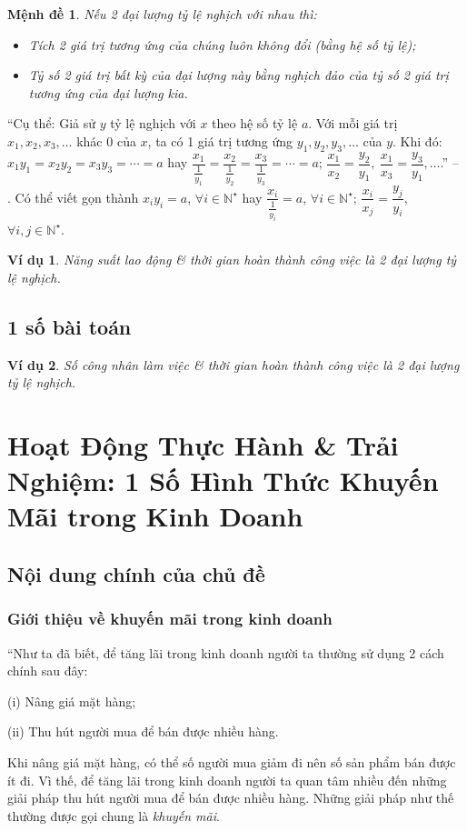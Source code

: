 \documentclass[oneside]{book}
\numberwithin{equation}{section}
\newtheorem{vidu}{Ví dụ}[section]
\newtheorem{menhde}{Mệnh đề}[section]
\begin{document}
\begin{menhde}
	Nếu 2 đại lượng tỷ lệ nghịch với nhau thì:
	\begin{itemize}
		\item Tích 2 giá trị tương ứng của chúng luôn không đổi (bằng hệ số tỷ lệ);
		\item Tỷ số 2 giá trị bất kỳ của đại lượng này bằng nghịch đảo của tỷ số 2 giá trị tương ứng của đại lượng kia.
	\end{itemize}
\end{menhde}
``Cụ thể: Giả sử $y$ tỷ lệ nghịch với $x$ theo hệ số tỷ lệ $a$. Với mỗi giá trị $x_1,x_2,x_3,\ldots$ khác $0$ của $x$, ta có 1 giá trị tương ứng $y_1,y_2,y_3,\ldots$ của $y$. Khi đó: $x_1y_1 = x_2y_2 = x_3y_3 = \cdots = a$ hay $\dfrac{x_1}{\frac{1}{y_1}} = \dfrac{x_2}{\frac{1}{y_2}} = \dfrac{x_3}{\frac{1}{y_3}} = \cdots = a$; $\dfrac{x_1}{x_2} = \dfrac{y_2}{y_1},\ \dfrac{x_1}{x_3} = \dfrac{y_3}{y_1},\ldots$.'' -- \cite[p. 66]{SGK_Toan_7_Canh_Dieu_tap_1}. Có thể viết gọn thành $x_iy_i = a$, $\forall i\in\mathbb{N}^\star$ hay $\dfrac{x_i}{\frac{1}{y_i}} = a$, $\forall i\in\mathbb{N}^\star$; $\dfrac{x_i}{x_j} = \dfrac{y_j}{y_i}$, $\forall i,j\in\mathbb{N}^\star$.

\begin{vidu}
	Năng suất lao động \& thời gian hoàn thành công việc là 2 đại lượng tỷ lệ nghịch.
\end{vidu}

\subsection{1 số bài toán}

\begin{vidu}
	Số công nhân làm việc \& thời gian hoàn thành công việc là 2 đại lượng tỷ lệ nghịch.
\end{vidu}

\section{Hoạt Động Thực Hành \& Trải Nghiệm: 1 Số Hình Thức Khuyến Mãi trong Kinh Doanh}

\subsection{Nội dung chính của chủ đề}

\subsubsection{Giới thiệu về khuyến mãi trong kinh doanh}
``Như ta đã biết, để tăng lãi trong kinh doanh người ta thường sử dụng 2 cách chính sau đây:
\begin{enumerate*}
	\item[(i)] Nâng giá mặt hàng;
	\item[(ii)] Thu hút người mua để bán được nhiều hàng.
\end{enumerate*}
Khi nâng giá mặt hàng, có thể số người mua giảm đi nên số sản phẩm bán được ít đi. Vì thế, để tăng lãi trong kinh doanh người ta quan tâm nhiều đến những giải pháp thu hút người mua để bán được nhiều hàng. Những giải pháp như thế thường được gọi chung là \textit{khuyến mãi}.
\end{document}
